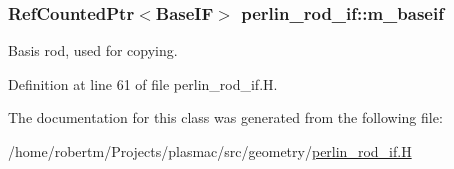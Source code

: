 \subsubsection[{\texorpdfstring{m\+\_\+baseif}{m_baseif}}]{\setlength{\rightskip}{0pt plus 5cm}Ref\+Counted\+Ptr$<$Base\+IF$>$ perlin\+\_\+rod\+\_\+if\+::m\+\_\+baseif\hspace{0.3cm}{\ttfamily [protected]}}\hypertarget{classperlin__rod__if_a7beef630675e687ed71d64b57f947f92}{}\label{classperlin__rod__if_a7beef630675e687ed71d64b57f947f92}


Basis rod, used for copying. 



Definition at line 61 of file perlin\+\_\+rod\+\_\+if.\+H.



The documentation for this class was generated from the following file\+:\begin{DoxyCompactItemize}
\item 
/home/robertm/\+Projects/plasmac/src/geometry/\hyperlink{perlin__rod__if_8H}{perlin\+\_\+rod\+\_\+if.\+H}\end{DoxyCompactItemize}
